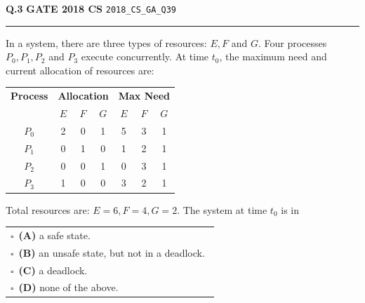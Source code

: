\documentclass[a4paper,10pt]{article}
\begin{document}
\begin{tcolorbox}[
    blanker,
    sidebyside,
    sidebyside align=top,
    lefthand width=0.55\textwidth,
    top=4pt, bottom=4pt, left=0pt, right=0pt,
    middle=16pt,
    underlay={
        \draw[dashed, black!80, line width=0.8pt, dash pattern=on 4pt off 3pt]
            ([xshift=0.55\textwidth+8pt]frame.north west) --
            ([xshift=0.55\textwidth+8pt]frame.south west);
    }
]
\textbf{Q.3}  \hfill {\footnotesize\textbf{GATE 2018 CS} \quad \tiny\texttt{2018\_CS\_GA\_Q39}}
\vspace{2pt}\hrule height 0.3pt\vspace{4pt}

In a system, there are three types of resources: $E, F$ and $G$. Four processes $P_0, P_1, P_2$ and $P_3$ execute concurrently. At time $t_0$, the maximum need and current allocation of resources are:
\begin{center}
\begin{tabular}{c|ccc|ccc}
\textbf{Process} & \multicolumn{3}{c|}{\textbf{Allocation}} & \multicolumn{3}{c}{\textbf{Max Need}} \\
& $E$ & $F$ & $G$ & $E$ & $F$ & $G$ \\
\hline
$P_0$ & 2 & 0 & 1 & 5 & 3 & 1 \\
$P_1$ & 0 & 1 & 0 & 1 & 2 & 1 \\
$P_2$ & 0 & 0 & 1 & 0 & 3 & 1 \\
$P_3$ & 1 & 0 & 0 & 3 & 2 & 1 \\
\end{tabular}
\end{center}
Total resources are: $E = 6, F = 4, G = 2$. The system at time $t_0$ is in

\par\vspace{6pt}\noindent
\begin{tabular}{@{}p{0.98\linewidth}@{}}
$\square$\ \textbf{(A)} a safe state. \\
\addlinespace[3pt]
$\square$\ \textbf{(B)} an unsafe state, but not in a deadlock. \\
\addlinespace[3pt]
$\square$\ \textbf{(C)} a deadlock. \\
\addlinespace[3pt]
$\square$\ \textbf{(D)} none of the above.
\end{tabular}

\tcblower


\end{tcolorbox}
\end{document}
